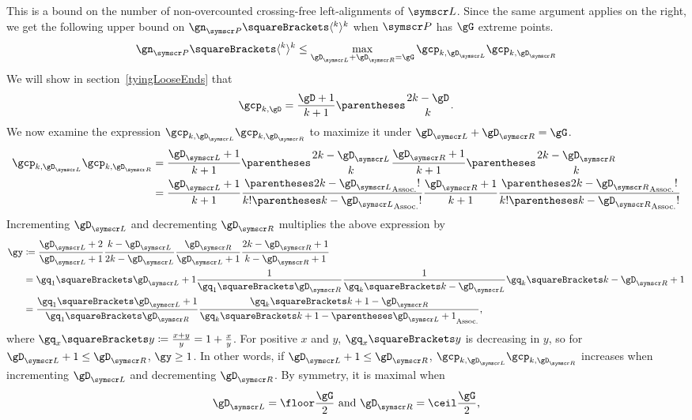 \documentclass[10pt, a4paper, twoside]{basestyle}
\newcommand{\pointset}{\symscr}
\begin{document}
This is a bound on the number of non-overcounted crossing-free left-alignments of $\pointset L$.
Since the same argument applies on the right, we get the following upper bound on
$\gn_{\pointset P}\of{\langle^k\rangle^k}$ when $\pointset P$ has $\gG$ extreme points.\[
\gn_{\pointset P}\of{\langle^k\rangle^k}\leq
\max_{\gD_{\pointset L} + \gD_{\pointset R} = \gG} \gcp_{k,\gD_{\pointset L}} \gcp_{k,\gD_{\pointset R}}
\]
We will show in section~\ref{tyingLooseEnds} that\[
\gcp_{k,\gD}=\frac{\gD+1}{k+1}\binom{2k-\gD}{k}\text.
\]
We now examine the expression $\gcp_{k,\gD_{\pointset L}} \gcp_{k,\gD_{\pointset R}}$ to maximize it under
$\gD_{\pointset L} + \gD_{\pointset R} = \gG$.\begin{align*}
\gcp_{k,\gD_{\pointset L}} \gcp_{k,\gD_{\pointset R}} &=
\frac{\gD_{\pointset L}+1}{k+1}\binom{2k-\gD_{\pointset L}}{k} \frac{\gD_{\pointset R}+1}{k+1}\binom{2k-\gD_{\pointset R}}{k} \\
&= \frac{\gD_{\pointset L}+1}{k+1}
\frac{\Factorial{\pa{2k-\gD_{\pointset L}}}}{\Factorial k \Factorial{\pa{k-\gD_{\pointset L}}}}
\frac{\gD_{\pointset R}+1}{k+1}
\frac{\Factorial{\pa{2k-\gD_{\pointset R}}}}{\Factorial k \Factorial{\pa{k-\gD_{\pointset R}}}}
\end{align*}
Incrementing $\gD_{\pointset L}$ and decrementing $\gD_{\pointset R}$ multiplies the above expression by
\begin{align*}
\gy&\DefineAs
\frac{\gD_{\pointset L}+2}{\gD_{\pointset L}+1}
\frac{k-\gD_{\pointset L}}{2k-\gD_{\pointset L}}
\frac{\gD_{\pointset R}}{\gD_{\pointset L}+1}
\frac{2k-\gD_{\pointset R}+1}{k-\gD_{\pointset R}+1}\\
&=
\gq_1\of{\gD_{\pointset L}+1}
\frac{1}{\gq_1\of{\gD_{\pointset R}}}
\frac{1}{\gq_k\of{k-\gD_{\pointset L}}}
\gq_k\of{k-\gD_{\pointset R}+1} \\
&=
\frac{\gq_1\of{\gD_{\pointset L}+1}}{\gq_1\of{\gD_{\pointset R}}}
\frac{\gq_k\of{k+1-\gD_{\pointset R}}}{\gq_k\of{k+1-\pa{\gD_{\pointset L}+1}}}\text,
\end{align*}
where $\gq_x\of{y}\DefineAs\frac{x+y}{y}=1+\frac{x}{y}$.
For positive $x$ and $y$, $\gq_x\of{y}$ is decreasing in $y$, so for $\gD_{\pointset L}+1\leq \gD_{\pointset R}$,
$\gy\geq 1$. In other words, if $\gD_{\pointset L}+1\leq \gD_{\pointset R}$,
$\gcp_{k,\gD_{\pointset L}} \gcp_{k,\gD_{\pointset R}}$ increases when incrementing $\gD_{\pointset L}$ and
decrementing $\gD_{\pointset R}$. By symmetry, it is maximal when\[
\gD_{\pointset L} = \Floor{\frac \gG 2} \text{ and } \gD_{\pointset R} = \Ceiling{\frac \gG 2}\text,
\]
\end{document}
